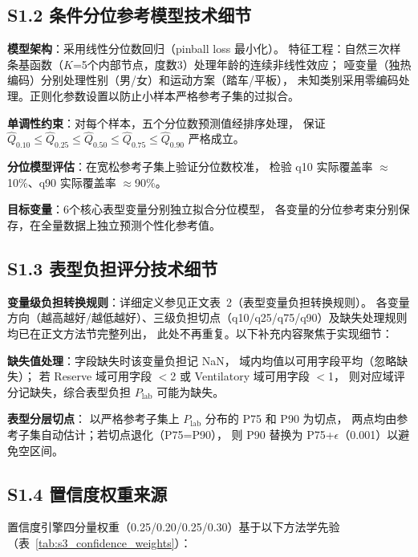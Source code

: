 \documentclass[12pt, a4paper]{ctexart}
\begin{document}
\subsection*{S1.2 条件分位参考模型技术细节}

\textbf{模型架构}：采用线性分位数回归（pinball loss 最小化）。
特征工程：自然三次样条基函数（$K$=5个内部节点，度数3）处理年龄的连续非线性效应；
哑变量（独热编码）分别处理性别（男/女）和运动方案（踏车/平板），
未知类别采用零编码处理。正则化参数设置以防止小样本严格参考子集的过拟合。

\textbf{单调性约束}：对每个样本，五个分位数预测值经排序处理，
保证 $\hat{Q}_{0.10} \leq \hat{Q}_{0.25} \leq \hat{Q}_{0.50}
\leq \hat{Q}_{0.75} \leq \hat{Q}_{0.90}$ 严格成立。

\textbf{分位模型评估}：在宽松参考子集上验证分位数校准，
检验 q10 实际覆盖率 $\approx$10\%、q90 实际覆盖率 $\approx$90\%。

\textbf{目标变量}：6个核心表型变量分别独立拟合分位模型，
各变量的分位参考束分别保存，在全量数据上独立预测个性化参考值。

\subsection*{S1.3 表型负担评分技术细节}

\textbf{变量级负担转换规则}：详细定义参见正文表~2（表型变量负担转换规则）。
各变量方向（越高越好/越低越好）、三级负担切点（q10/q25/q75/q90）及缺失处理规则均已在正文方法节完整列出，
此处不再重复。以下补充内容聚焦于实现细节：

\textbf{缺失值处理}：字段缺失时该变量负担记 NaN，
域内均值以可用字段平均（忽略缺失）；
若 Reserve 域可用字段 $<$2 或 Ventilatory 域可用字段 $<$1，
则对应域评分记缺失，综合表型负担 $P_{\text{lab}}$ 可能为缺失。

\textbf{表型分层切点}：
以严格参考子集上 $P_{\text{lab}}$ 分布的 P75 和 P90 为切点，
两点均由参考子集自动估计；若切点退化（P75=P90），
则 P90 替换为 P75+$\epsilon$（0.001）以避免空区间。

\subsection*{S1.4 置信度权重来源}

置信度引擎四分量权重（0.25/0.20/0.25/0.30）基于以下方法学先验（表~\ref{tab:s3_confidence_weights}）：
\end{document}
